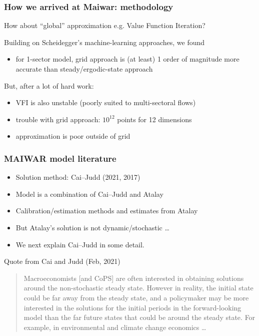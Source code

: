 \documentclass[handout,english]{beamer}
\begin{document}
\begin{frame}
  \frametitle{How we arrived at Maiwar: methodology}
  How about ``global'' approximation e.g. Value Function Iteration?

  Building on Scheidegger's machine-learning approaches, we found
  \begin{itemize}
    \item for 1-sector model, grid approach is (at least) 1 order of magnitude 
      more accurate than steady/ergodic-state approach
  \end{itemize}
  But, after a lot of hard work:
  \begin{itemize}
    \item VFI is also unstable (poorly suited to multi-sectoral flows)
    \item trouble with grid approach: $10 ^ {12}$ points for 12 dimensions
    \item approximation is poor outside of grid
  \end{itemize}
\end{frame}
\begin{frame}\thispagestyle{empty}
  \frametitle{MAIWAR model literature}
  \begin{itemize}
    \item Solution method: Cai--Judd (2021, 2017)
    \item Model is a combination of Cai--Judd and Atalay
    \item Calibration/estimation methods and estimates from Atalay
    \item But Atalay's solution is not dynamic/stochastic
      \dots
    \item We next explain Cai--Judd in some detail.
  \end{itemize}
\end{frame}
\begin{frame}
  {\color{blue} Quote from Cai and Judd (Feb, 2021)}
  \begin{quote}
  {\color{blue} Macroeconomists [and CoPS] are often interested in obtaining solutions around the non-stochastic steady state.}
  {\color{patrickcolor3} However in reality, the initial state could be far away from the steady state, and a policymaker may be more interested in the solutions for the initial periods in the forward-looking model than the far future states that could be around the steady state.}
  {\color{patrickcolor1} For example, in environmental and climate change economics \dots}
\end{quote}
\end{frame}
\end{document}
